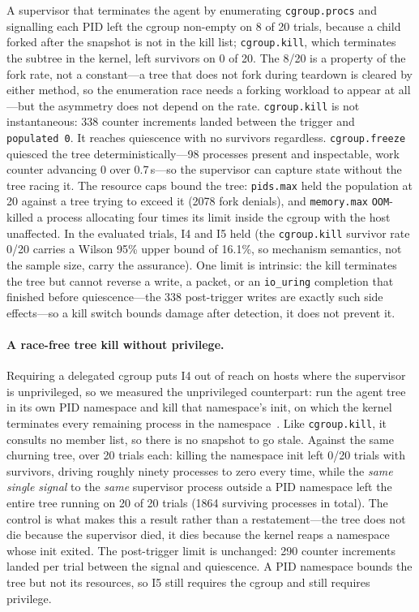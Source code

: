 \documentclass[11pt]{article}
\begin{document}
A supervisor that terminates the agent by enumerating \texttt{cgroup.procs} and signalling each PID left
the cgroup non-empty on 8 of 20 trials, because a child forked after the snapshot is not in the kill
list; \texttt{cgroup.kill}, which terminates the subtree in the kernel, left survivors on 0 of 20. The
8/20 is a property of the fork rate, not a constant---a tree that does not fork during teardown is cleared
by either method, so the enumeration race needs a forking workload to appear at all---but the asymmetry
does not depend on the rate. \texttt{cgroup.kill} is not instantaneous: 338 counter increments landed
between the trigger and \texttt{populated~0}. It reaches quiescence with no survivors regardless.
\texttt{cgroup.freeze} quiesced the tree deterministically---98 processes present and inspectable, work
counter advancing 0 over 0.7\,s---so the supervisor can capture state without the tree racing it. The
resource caps bound the tree: \texttt{pids.max} held the population at 20 against a tree trying to exceed
it (2078 fork denials), and \texttt{memory.max} \texttt{OOM}-killed a process allocating four times its
limit inside the cgroup with the host unaffected. In the evaluated trials, I4 and I5 held (the
\texttt{cgroup.kill} survivor rate 0/20 carries a Wilson 95\% upper bound of 16.1\%, so mechanism
semantics, not the sample size, carry the assurance). One limit is intrinsic: the kill terminates the
tree but cannot reverse a write, a packet, or an \texttt{io\_uring} completion that finished before
quiescence---the 338 post-trigger writes are exactly such side effects---so a kill switch bounds damage
after detection, it does not prevent it.

\paragraph{A race-free tree kill without privilege.} Requiring a delegated cgroup puts I4 out of reach on
hosts where the supervisor is unprivileged, so we measured the unprivileged counterpart: run the agent
tree in its own PID namespace and kill that namespace's init, on which the kernel terminates every
remaining process in the namespace~\cite{pidns}. Like \texttt{cgroup.kill}, it consults no member list,
so there is no snapshot to go stale. Against the same churning tree, over 20 trials each: killing the
namespace init left 0/20 trials with survivors, driving roughly ninety processes to zero every time,
while the \emph{same single signal} to the \emph{same} supervisor process outside a PID namespace left
the entire tree running on 20 of 20 trials (1864 surviving processes in total). The control is what makes
this a result rather than a restatement---the tree does not die because the supervisor died, it dies
because the kernel reaps a namespace whose init exited. The post-trigger limit is unchanged: 290 counter
increments landed per trial between the signal and quiescence. A PID namespace bounds the tree but not
its resources, so I5 still requires the cgroup and still requires privilege.
\end{document}
